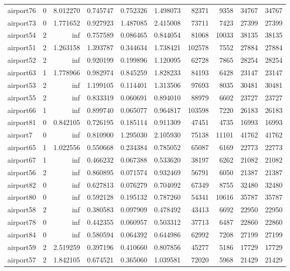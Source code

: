 \begin{longtable}{|l|r|r|r|r|r|r|r|r|r|}
airport76 & 0 & 8.012270 & 0.745747 & 0.752326 & 1.498073 & 82371 & 9358 & 34767 & 34767 \\
airport73 & 0 & 1.771652 & 0.927923 & 1.487085 & 2.415008 & 73711 & 7423 & 27399 & 27399 \\
airport54 & 2 & inf & 0.757589 & 0.086465 & 0.844054 & 81068 & 10033 & 38135 & 38135 \\
airport51 & 2 & 1.263158 & 1.393787 & 0.344634 & 1.738421 & 102578 & 7552 & 27884 & 27884 \\
airport52 & 2 & inf & 0.920199 & 0.199896 & 1.120095 & 62728 & 7865 & 28254 & 28254 \\
airport63 & 1 & 1.778966 & 0.982974 & 0.845259 & 1.828233 & 84193 & 6428 & 23147 & 23147 \\
airport53 & 2 & inf & 1.199105 & 0.114401 & 1.313506 & 97693 & 8035 & 30481 & 30481 \\
airport55 & 2 & inf & 0.833319 & 0.060691 & 0.894010 & 88979 & 6602 & 23727 & 23727 \\
airport66 & 1 & inf & 0.899740 & 0.065077 & 0.964817 & 103598 & 7220 & 26183 & 26183 \\
airport81 & 0 & 0.842105 & 0.726195 & 0.185114 & 0.911309 & 47451 & 4735 & 16993 & 16993 \\
airport7 & 0 & inf & 0.810900 & 1.295030 & 2.105930 & 75138 & 11101 & 41762 & 41762 \\
airport65 & 1 & 1.022556 & 0.550668 & 0.234384 & 0.785052 & 65087 & 6169 & 22773 & 22773 \\
airport67 & 1 & inf & 0.466232 & 0.067388 & 0.533620 & 38197 & 6262 & 21082 & 21082 \\
airport56 & 2 & inf & 0.860895 & 0.071574 & 0.932469 & 56791 & 6050 & 21387 & 21387 \\
airport82 & 0 & inf & 0.627813 & 0.076279 & 0.704092 & 67349 & 8755 & 32480 & 32480 \\
airport80 & 0 & inf & 0.592128 & 0.195132 & 0.787260 & 54341 & 10616 & 35787 & 35787 \\
airport58 & 2 & inf & 0.380583 & 0.097909 & 0.478492 & 43413 & 6692 & 22950 & 22950 \\
airport78 & 0 & inf & 0.442355 & 0.060957 & 0.503312 & 37713 & 6487 & 22860 & 22860 \\
airport84 & 0 & inf & 0.580594 & 0.064392 & 0.644986 & 62992 & 7208 & 27199 & 27199 \\
airport59 & 2 & 2.519259 & 0.397196 & 0.410660 & 0.807856 & 45277 & 5186 & 17729 & 17729 \\
airport57 & 2 & 1.842105 & 0.674521 & 0.365060 & 1.039581 & 72020 & 5968 & 21429 & 21429 \\

\end{longtable}
